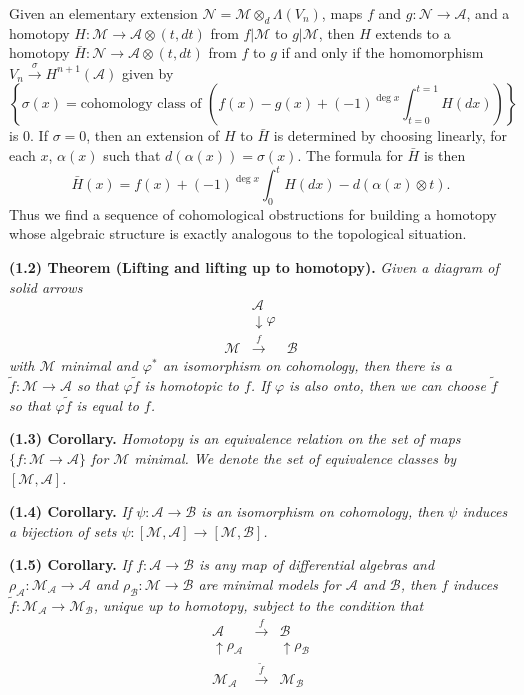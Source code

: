 \documentclass[
  english,
  a3paper,
  a3paper]{extarticle}
\begin{document}
Given an elementary extension
\(\mathcal N=\mathcal M\otimes_d\Lambda(V_n)\), maps \(f\) and
\(g:\mathcal N\to\mathscr A\), and a homotopy
\(H:\mathcal M\to\mathscr A\otimes(t,dt)\) from \(f|\mathcal M\) to
\(g|\mathcal M\), then \(H\) extends to a homotopy
\(\bar H:\mathcal N\to\mathscr A\otimes(t,dt)\) from \(f\) to \(g\) if
and only if the homomorphism
\(V_n\xrightarrow{\sigma}H^{n+1}(\mathscr A)\) given by \[
\left\{\sigma(x)=\text{cohomology class of }\left(f(x)-g(x)+(-1)^{\deg x}\int_{t=0}^{t=1}H(dx)\right)\right\}
\] is 0. If \(\sigma=0\), then an extension of \(H\) to \(\bar H\) is
determined by choosing linearly, for each \(x\), \(\alpha(x)\) such that
\(d(\alpha(x))=\sigma(x)\). The formula for \(\bar H\) is then \[
\bar H(x)=f(x)+(-1)^{\deg x}\int_0^tH(dx)-d(\alpha(x)\otimes t).
\] Thus we find a sequence of cohomological obstructions for building a
homotopy whose algebraic structure is exactly analogous to the
topological situation.

\textbf{(1.2) Theorem (Lifting and lifting up to homotopy).} \emph{Given
a diagram of solid arrows} \[
\begin{array}{ccc}
&\mathscr A&\\[-2mm]
&\downarrow\scriptstyle\varphi&\\[-2mm]
\mathcal M&\xrightarrow{f}&\mathscr B
\end{array}
\] \emph{with \(\mathcal M\) minimal and \(\varphi^*\) an isomorphism on
cohomology, then there is a \(\tilde f:\mathcal M\to\mathscr A\) so that
\(\varphi\tilde f\) is homotopic to \(f\). If \(\varphi\) is also onto,
then we can choose \(\tilde f\) so that \(\varphi\tilde f\) is equal to
\(f\).}

\textbf{(1.3) Corollary.} \emph{Homotopy is an equivalence relation on
the set of maps \(\{f:\mathcal M\to\mathscr A\}\) for \(\mathcal M\)
minimal. We denote the set of equivalence classes by
\([\mathcal M,\mathscr A]\).}

\textbf{(1.4) Corollary.} \emph{If \(\psi:\mathscr A\to\mathscr B\) is
an isomorphism on cohomology, then \(\psi\) induces a bijection of sets
\(\psi:[\mathcal M,\mathscr A]\to[\mathcal M,\mathscr B]\).}

\textbf{(1.5) Corollary.} \emph{If \(f:\mathscr A\to\mathscr B\) is any
map of differential algebras and
\(\rho_{\mathscr A}:\mathcal M_{\mathscr A}\to\mathscr A\) and
\(\rho_{\mathscr B}:\mathcal M\to\mathscr B\) are minimal models for
\(\mathscr A\) and \(\mathscr B\), then \(f\) induces
\(\tilde f:\mathcal M_{\mathscr A}\to\mathcal M_{\mathscr B}\), unique
up to homotopy, subject to the condition that} \[
\begin{array}{ccc}
\mathscr A&\xrightarrow{f}&\mathscr B\\
\uparrow\scriptstyle\rho_{\mathscr A}&&\uparrow\scriptstyle\rho_{\mathscr B}\\
\mathcal M_{\mathscr A}&\xrightarrow{\tilde f}&\mathcal M_{\mathscr B}
\end{array}
\]
\end{document}
